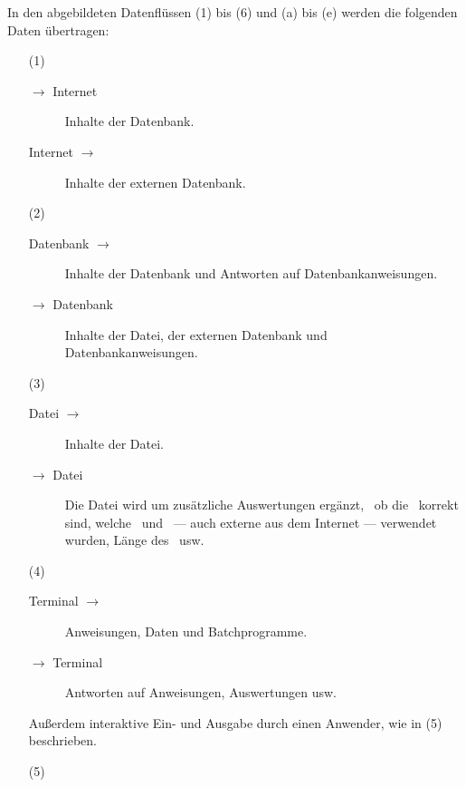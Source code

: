 In den  abgebildeten Datenflüssen (1) bis (6) und (a) bis (e) werden die folgenden Daten übertragen:
\begin{itemize}
	\newcommand*{\vonnach}  [2]{#1 $\rightarrow$ #2}
	\newcommand*{\nachvon}  [2]{\vonnach{#2}{#1}}
	\newcommand*{\hinundher}[2]{#1 $\leftrightarrow$ #2}
	\item[(1)]\label{dat:Internet}
	\begin{description}
		\item[\vonnach{\ASBA}{Internet}]\label{dat:ausInternet}
		Inhalte der Datenbank.
		\item[\nachvon{\ASBA}{Internet}]\label{dat:inInternet}
		Inhalte der externen Datenbank.
	\end{description}
	\item[(2)]\label{dat:Datenbank}
	\begin{description}
		\item[\vonnach{Datenbank}{\ASBA}]\label{dat:ausDatenbank}
		Inhalte der Datenbank und Antworten auf Datenbankanweisungen.
		\item[\nachvon{Datenbank}{\ASBA}]\label{dat:inDatenbank}
		Inhalte der Datei, der externen Datenbank und Datenbankanweisungen.
	\end{description}
	\item[(3)]\label{dat:Datei}
	\begin{description}
		\item[\vonnach{Datei}{\ASBA}]\label{dat:ausDatei}
		Inhalte der Datei.
		\item[\nachvon{Datei}{\ASBA}]\label{dat:inDatei}
		Die Datei wird um zusätzliche Auswertungen ergänzt, \textzB\ ob die \Beweise\ korrekt sind, welche \Axiome\ und \Saetze\ --- auch externe aus dem Internet --- verwendet wurden, Länge des \Beweises\ usw.
	\end{description}
	\item[(4)]\label{dat:Terminal}
	\begin{description}
		\item[\vonnach{Terminal}{\ASBA}]\label{dat:ausTerminal}
		Anweisungen, Daten und Batchprogramme.
		\item[\nachvon{Terminal}{\ASBA}]\label{dat:inTerminal}
		Antworten auf Anweisungen, Auswertungen usw.
	\end{description}
	Außerdem interaktive Ein- und Ausgabe durch einen Anwender, wie in (5) beschrieben.
	\item[(5)]\label{dat:Anwender}
	\begin{description}

\end{description}
\end{itemize}

